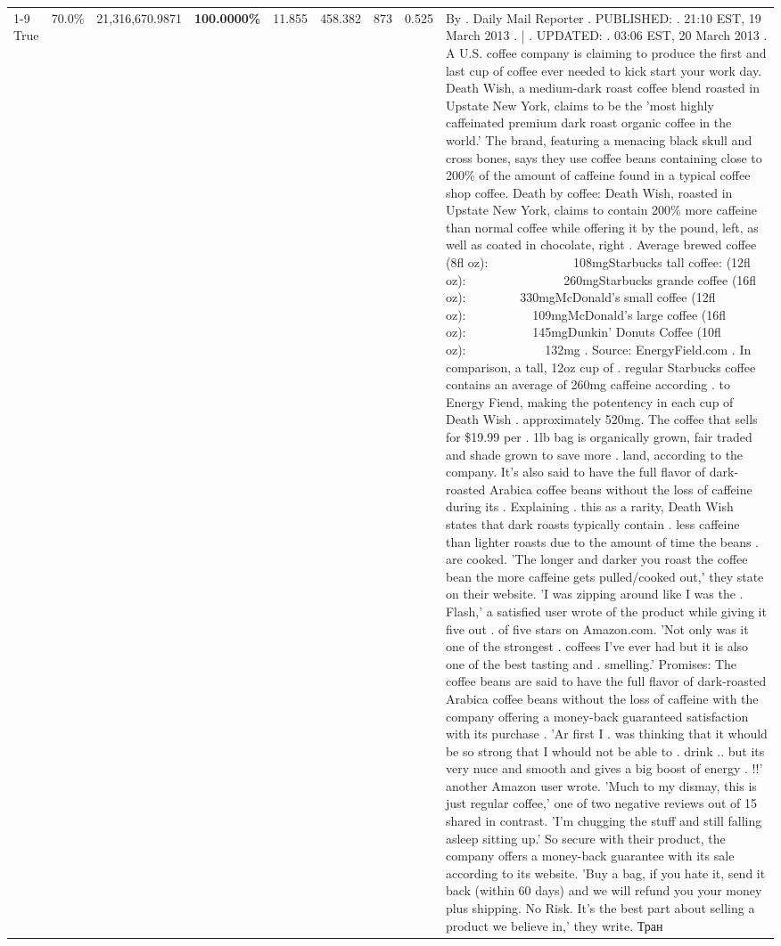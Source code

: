 \begin{table}[H]
{\begin{tabular}{lllrlllll}
\cline{1-9}
True & 70.0\% & 21,316,670.9871 & \bfseries \color{red} 100.0000\% & 11.855 & 458.382 & 873 & 0.525 & By . Daily Mail Reporter . PUBLISHED: . 21:10 EST, 19 March 2013 . | . UPDATED: . 03:06 EST, 20 March 2013 . A U.S. coffee company is claiming to produce the first and last cup of coffee ever needed to kick start your work day. Death Wish, a medium-dark roast coffee blend roasted in Upstate New York, claims to be the 'most highly caffeinated premium dark roast organic coffee in the world.' The brand, featuring a menacing black skull and cross bones, says they use coffee beans containing close to 200\% of the amount of caffeine found in a typical coffee shop coffee. Death by coffee: Death Wish, roasted in Upstate New York, claims to contain 200\% more caffeine than normal coffee while offering it by the pound, left, as well as coated in chocolate, right . Average brewed coffee (8fl oz):              108mgStarbucks tall coffee: (12fl oz):                260mgStarbucks grande coffee (16fl oz):         330mgMcDonald's small coffee (12fl oz):           109mgMcDonald's large coffee (16fl oz):           145mgDunkin' Donuts Coffee (10fl oz):             132mg . Source: EnergyField.com . In comparison, a tall, 12oz cup of . regular Starbucks coffee contains an average of 260mg caffeine according . to Energy Fiend, making the potentency in each cup of Death Wish . approximately 520mg. The coffee that sells for \$19.99 per . 1lb bag is organically grown, fair traded and shade grown to save more . land, according to the company. It's also said to have the full flavor of dark-roasted Arabica coffee beans without the loss of caffeine during its . Explaining . this as a rarity, Death Wish states that dark roasts typically contain . less caffeine than lighter roasts due to the amount of time the beans . are cooked. 'The longer and darker you roast the coffee bean the more caffeine gets pulled/cooked out,' they state on their website. 'I was zipping around like I was the . Flash,' a satisfied user wrote of the product while giving it five out . of five stars on Amazon.com. 'Not only was it one of the strongest . coffees I've ever had but it is also one of the best tasting and . smelling.’ Promises: The coffee beans are said to have the full flavor of dark-roasted Arabica coffee beans without the loss of caffeine with the company offering a money-back guaranteed satisfaction with its purchase . 'Ar first I . was thinking that it whould be so strong that I whould not be able to . drink .. but its very nuce and smooth and gives a big boost of energy . !!' another Amazon user wrote. 'Much to my dismay, this is just regular coffee,' one of two negative reviews out of 15 shared in contrast. 'I'm chugging the stuff and still falling asleep sitting up.' So secure with their product, the company offers a money-back guarantee with its sale according to its website. 'Buy a bag, if you hate it, send it back (within 60 days) and we will refund you your money plus shipping. No Risk. It’s the best part about selling a product we believe in,' they write. Тран \\

\end{tabular}}
\end{table}
